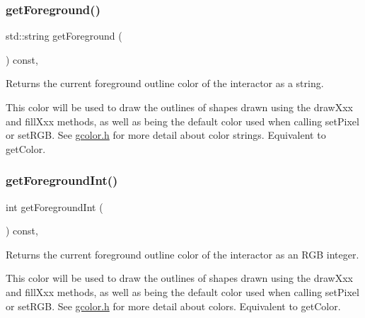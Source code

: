 \mbox{\label{classGDrawingSurface_a4fa2d8b0192a3a5b4af4bbfe71194d03}} 
\subsubsection{\texorpdfstring{get\+Foreground()}{getForeground()}}
{\footnotesize\ttfamily std\+::string get\+Foreground (\begin{DoxyParamCaption}{ }\end{DoxyParamCaption}) const\hspace{0.3cm}{\ttfamily [virtual]}, {\ttfamily [inherited]}}



Returns the current foreground outline color of the interactor as a string. 

This color will be used to draw the outlines of shapes drawn using the draw\+Xxx and fill\+Xxx methods, as well as being the default color used when calling set\+Pixel or set\+R\+GB. See \mbox{\hyperlink{gcolor_8h_source}{gcolor.\+h}} for more detail about color strings. Equivalent to get\+Color. \mbox{\label{classGDrawingSurface_ac3b12ab385a6ef9ae90fc879860ba726}} 
\subsubsection{\texorpdfstring{get\+Foreground\+Int()}{getForegroundInt()}}
{\footnotesize\ttfamily int get\+Foreground\+Int (\begin{DoxyParamCaption}{ }\end{DoxyParamCaption}) const\hspace{0.3cm}{\ttfamily [virtual]}, {\ttfamily [inherited]}}



Returns the current foreground outline color of the interactor as an R\+GB integer. 

This color will be used to draw the outlines of shapes drawn using the draw\+Xxx and fill\+Xxx methods, as well as being the default color used when calling set\+Pixel or set\+R\+GB. See \mbox{\hyperlink{gcolor_8h_source}{gcolor.\+h}} for more detail about colors. Equivalent to get\+Color. \mbox{\label{classGWindow_adf27adaeeb8b551424b2096a20285fde}} 
